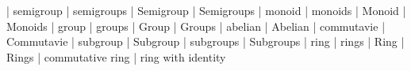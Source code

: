 | semigroup
| semigroups
| Semigroup
| Semigroups
| monoid
| monoids
| Monoid
| Monoids
| group
| groups
| Group
| Groups
| abelian
| Abelian
| commutavie
| Commutavie
| subgroup
| Subgroup
| subgroups
| Subgroups
| ring
| rings
| Ring
| Rings
| commutative ring
| ring with identity
